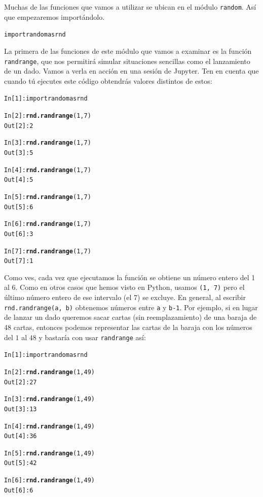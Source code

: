 \documentclass[10pt,a4paper]{article}\usepackage[]{graphicx}\usepackage[]{color}
\makeatletter
\newcommand{\hlkwd}[1]{\textcolor[rgb]{0.737,0.353,0.396}{\textbf{#1}}}%
\newenvironment{kframe}{%
 \def\at@end@of@kframe{}%
 \ifinner\ifhmode%
  \def\at@end@of@kframe{\end{minipage}}%
  \begin{minipage}{\columnwidth}%
 \fi\fi%
 \def\FrameCommand##1{\hskip\@totalleftmargin \hskip-\fboxsep
 \colorbox{shadecolor}{##1}\hskip-\fboxsep
     \hskip-\linewidth \hskip-\@totalleftmargin \hskip\columnwidth}%
 \MakeFramed {\advance\hsize-\width
   \@totalleftmargin\z@ \linewidth\hsize
   \@setminipage}}%
 {\par\unskip\endMakeFramed%
 \at@end@of@kframe}
\newenvironment{knitrout}{}{} %
\makeatother
\begin{document}
Muchas de las funciones que vamos a utilizar se ubican en el módulo {\tt random}. Así que empezaremos importándolo.
\begin{knitrout}
\color{fgcolor}\begin{kframe}
\begin{alltt}
import random as rnd
\end{alltt}
\end{kframe}
\end{knitrout}
La primera de las funciones de este módulo que vamos a examinar es la función {\tt randrange}, que nos permitirá simular situaciones sencillas como el lanzamiento de un dado. Vamos a verla en acción en una sesión de Jupyter. Ten en cuenta que cuando tú ejecutes este código obtendrás valores distintos de estos:
\begin{knitrout}
\color{fgcolor}\begin{kframe}
\begin{alltt}
In [1]: import random as rnd

In [2]: \hlkwd{rnd.randrange}(1, 7)
Out[2]: 2

In [3]: \hlkwd{rnd.randrange}(1, 7)
Out[3]: 5

In [4]: \hlkwd{rnd.randrange}(1, 7)
Out[4]: 5

In [5]: \hlkwd{rnd.randrange}(1, 7)
Out[5]: 6

In [6]: \hlkwd{rnd.randrange}(1, 7)
Out[6]: 3

In [7]: \hlkwd{rnd.randrange}(1, 7)
Out[7]: 1
\end{alltt}
\end{kframe}
\end{knitrout}
Como ves, cada vez que ejecutamos la función se obtiene un número entero del 1 al 6. Como en otros casos que hemos visto en Python, usamos {\tt (1, 7)} pero el último número entero de ese intervalo (el 7) se excluye. En general, al escribir {\tt rnd.randrange(a, b)} obtenemos números entre {\tt a} y {\tt b-1}. Por ejemplo, si en lugar de lanzar un dado queremos sacar cartas (sin reemplazamiento) de una baraja de 48 cartas, entonces podemos representar las cartas de la baraja con los números del $1$ al $48$ y bastaría con usar {\tt randrange} así:
\begin{knitrout}
\color{fgcolor}\begin{kframe}
\begin{alltt}
In [1]: import random as rnd

In [2]: \hlkwd{rnd.randrange}(1, 49)
Out[2]: 27

In [3]: \hlkwd{rnd.randrange}(1, 49)
Out[3]: 13

In [4]: \hlkwd{rnd.randrange}(1, 49)
Out[4]: 36

In [5]: \hlkwd{rnd.randrange}(1, 49)
Out[5]: 42

In [6]: \hlkwd{rnd.randrange}(1, 49)
Out[6]: 6
\end{alltt}
\end{kframe}
\end{knitrout}
\end{document}
